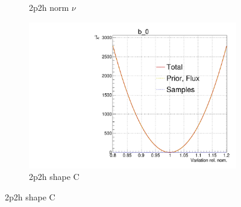 \begin{figure}[!h]
\begin{subfigure}[t]{0.32\textwidth}
		\caption{2p2h norm $\nu$}
	\end{subfigure}
	\begin{subfigure}[t]{0.32\textwidth}
		\includegraphics[width=\textwidth, trim={0mm 0mm 0mm 11mm}, clip,page=113]{figures/mach3/Asimov/Full_LLHscan_18July_BeRPA_U_ND280logL_scan}
		\caption{2p2h shape C}
	\end{subfigure}
	

\end{figure}
